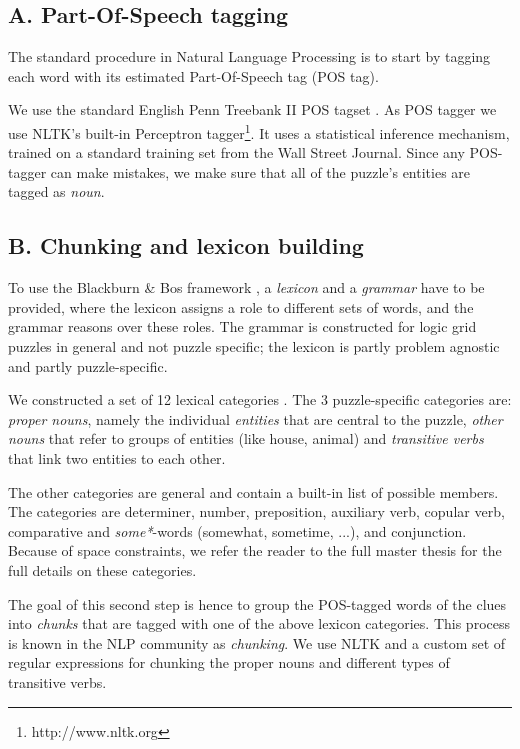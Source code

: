\subsection{A. Part-Of-Speech tagging}
The standard procedure in Natural Language Processing is to start by tagging each word with its estimated Part-Of-Speech tag (POS tag). %

We use the standard English Penn Treebank II POS tagset \cite{DBLP:journals/coling/MarcusSM94}. As POS tagger we use NLTK's built-in Perceptron tagger\footnote{http://www.nltk.org}. It uses a statistical inference mechanism, trained on a standard training set from the Wall Street Journal. 
Since any POS-tagger can make mistakes, we make sure that all of the puzzle's entities are tagged as \textit{noun}.

\subsection{B. Chunking and lexicon building}
To use the Blackburn \& Bos framework \cite{Blackburn2005,Blackburn2006}, a \textit{lexicon} and a \textit{grammar} have to be provided, where the lexicon assigns a role to different sets of words, and the grammar reasons over these roles. The grammar is constructed for logic grid puzzles in general and not puzzle specific; the lexicon is partly problem agnostic and partly puzzle-specific.

We constructed a set of 12 lexical categories \cite{msc/Claes17}. The 3 puzzle-specific categories are: \textit{proper nouns}, namely the individual \textit{entities} that are central to the puzzle, \textit{other nouns} that refer to groups of entities (like house, animal) and \textit{transitive verbs} that link two entities to each other.

The other categories are general and contain a built-in list of possible members. The categories are determiner, number, preposition, auxiliary verb, copular verb, comparative and \textit{some*}-words (somewhat, sometime, ...), and conjunction. Because of space constraints, we refer the reader to the full master thesis for the full details on these categories.


The goal of this second step is hence to group the POS-tagged words of the clues into \textit{chunks} that are tagged with one of the above lexicon categories. This process is known in the NLP community as \textit{chunking}. We use NLTK and a custom set of regular expressions for chunking the proper nouns and different types of transitive verbs. %

